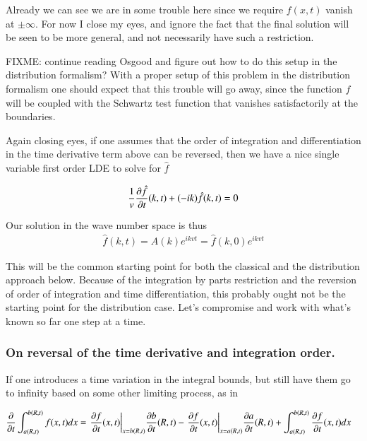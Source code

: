 Already we can see we are in some trouble here since we require 
$f(x,t)$ vanish at $\pm \infty$.
For now I close my eyes, and ignore the fact that the final solution will be seen to be more 
general, and not necessarily have such a restriction.

FIXME: continue reading Osgood and figure out how to do this setup in the distribution formalism?
With a proper setup of this problem in the distribution formalism one should expect that this trouble will
go away, since the function $f$ will be coupled with the Schwartz test function
that vanishes satisfactorily at the boundaries.

Again closing eyes, if one assumes that the order of integration and
differentiation in the time 
derivative term above can be reversed, then
we have a nice single variable first order LDE to solve for $\hat{f}$

\begin{align}
\inv{v} \PD{t}{\hat{f}}(k,t) + (-ik)\hat{f}(k,t) = 0
\end{align}

Our solution in the wave number space is thus
\begin{align}\label{eqn:startingPtFirstOrder}
{\hat{f}}(k,t) = A(k) e^{i k v t} = \hat{f}(k,0) e^{i k v t}
\end{align}

This will be the common starting point for both the classical and the distribution approach below.
Because of the integration by parts restriction and the reversion of order of integration and time differentiation, this probably ought not
be the starting point for the distribution case.  Let's compromise and work with what's known so far one step at a time.

\subsubsection{On reversal of the time derivative and integration order. }

If one introduces a time variation
in the integral bounds, but still have them go to infinity based on some
other limiting process, as in

\begin{align*}
\PD{t}{} \int_{a(R,t)}^{b(R,t)} f(x,t) dx
&=
{\left.\PD{t}{f}(x,t)\right\vert}_{x = b(R,t)} \PD{t}{b}(R,t)
-{\left.\PD{t}{f}(x,t)\right\vert}_{x = a(R,t)} \PD{t}{a}(R,t)
+ \int_{a(R,t)}^{b(R,t)} \PD{t}{f}(x,t) dx
\end{align*}

